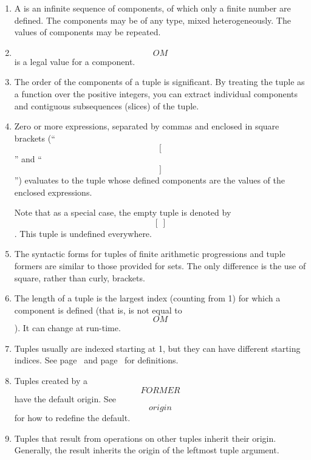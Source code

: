     \begin{enumerate}
    \item
    A  is an infinite sequence of components,
    of which only a finite number are defined.
    The components may be of any type, mixed heterogeneously. The values of
    components may be repeated.

    \item
    \[OM\] is a legal value for a component.

    \item
    The order of the components of a tuple is significant.
    By treating the tuple as a function over the positive integers,
    you can extract individual components and 
    contiguous subsequences (slices) of the tuple.

    \item
    Zero or more expressions, separated by commas and enclosed in
    square brackets (``\[[\]'' and ``\[]\]'') evaluates to
    the tuple whose defined components are the values of the
    enclosed expressions.

    Note that as a special case, the empty tuple is denoted by \[[~]\].
    This tuple is undefined everywhere.

    \item
    The syntactic forms for tuples of finite arithmetic progressions
    and tuple formers are similar to those provided for sets.
    The only difference is the use of square,
    rather than curly, brackets.

    \item
    The length of a tuple is the largest index (counting from 1) for which
    a component is defined (that is, is not equal to \[OM\]).
    It can change at run-time.

    \item
    Tuples usually are indexed starting at 1,
    but they can have different starting indices.
    See page~\pageref{tuple-at} and page~\pageref{tuple-func} for definitions.

    \item
    Tuples created by a \[FORMER\] have the default origin.  See
    \[origin\] for how to redefine the default.

    \item
    Tuples that result from operations on other tuples inherit their origin.
    Generally, the result inherits the origin of the leftmost tuple argument.
    \end{enumerate}

